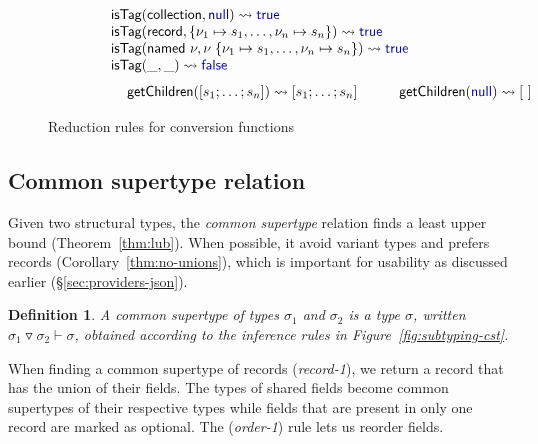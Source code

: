 \documentclass[10pt,preprint,clearpagebib]{sigplanconf}
\newcommand{\kvd}[1]{\textnormal{\textcolor{kvdclr}{\sffamily #1}}}
\newcommand{\ident}[1]{\textnormal{\sffamily #1}}
\newcommand{\reduce}{\rightsquigarrow}
\newtheorem{definition}{Definition}
\begin{document}
\begin{figure}
\begin{equation*}
\begin{array}{l}
\ident{isTag}(\ident{collection}, \kvd{null}) \reduce \kvd{true} \\
\ident{isTag}(\ident{record}, \{ \nu_1\mapsto s_1, \ldots, \nu_n\mapsto s_n \}) \reduce \kvd{true} \\
\ident{isTag}(\ident{named}~\nu, \nu\;\{ \nu_1\mapsto s_1, \ldots, \nu_n\mapsto s_n \}) \reduce \kvd{true} \\
\ident{isTag}(\_, \_) \reduce \kvd{false} \\
\end{array}
\end{equation*}
\vspace{-1em}
\begin{equation*}
 \hspace{5.6em}
 \ident{getChildren}([s_1; \ldots; s_n]) \reduce [s_1; \ldots; s_n]  \qquad\quad
 \ident{getChildren}(\kvd{null}) \reduce [~] 
\end{equation*}

\caption{Reduction rules for conversion functions}
\label{fig:op-conversions}
\end{figure}


\subsection{Common supertype relation}
\label{sec:inference-commonsuper}

Given two structural types, the \emph{common supertype} relation finds a least upper bound
(Theorem~\ref{thm:lub}). When possible, it avoid variant types and prefers records 
(Corollary~\ref{thm:no-unions}), which is important for usability as discussed earlier
(\S\ref{sec:providers-json}). 

\begin{definition}
A \emph{common supertype} of types $\sigma_1$ and $\sigma_2$ is a type $\sigma$, written 
$\sigma_1 \triangledown \sigma_2 \vdash \sigma$, obtained according to the inference rules in 
Figure~\ref{fig:subtyping-cst}.
\end{definition}

\noindent
When finding a common supertype of records (\emph{record-1}), we return a record that has the 
union of their fields. The types of shared fields become common supertypes of their respective 
types while fields that are present in only one record are marked as optional. The (\emph{order-1})
rule lets us reorder fields.
\end{document}
